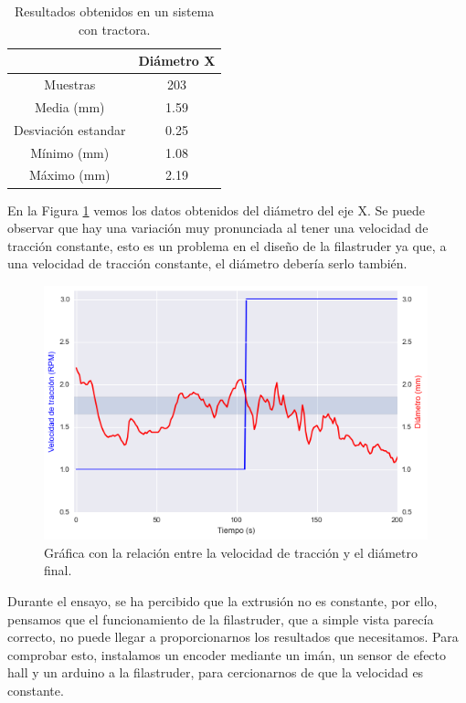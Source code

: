 \begin{table}[H]
    \centering
    \begin{tabular}{cc}
                   & Diámetro X \\ \hline
        Muestras    & 203        \\
        Media (mm) & 1.59       \\
        Desviación estandar & 0.25\\
        Mínimo (mm)   & 1.08       \\
        Máximo (mm)   & 2.19      
    \end{tabular}
    \caption{Resultados obtenidos en un sistema con tractora.}
    \label{tab:20007105-dat}
\end{table}

En la Figura \ref{fig:2007105-graf} vemos los datos obtenidos del diámetro del eje X. Se puede observar que hay una variación muy pronunciada al tener una velocidad de tracción constante, esto es un problema en el diseño de la filastruder ya que, a una velocidad de tracción constante, el diámetro debería serlo también.

\begin{figure}[H]
    \centering
    \includegraphics[width=0.99\textwidth]{images/producciones/20072015/output_8_0.png}
    \caption[Gráfica con la relación entre la velocidad de tracción y el diámetro final.]{Gráfica con la relación entre la velocidad de tracción y el diámetro final.}
    \label{fig:2007105-graf}
\end{figure}

 Durante el ensayo, se ha percibido que la extrusión no es constante, por ello, pensamos que el funcionamiento de la filastruder, que a simple vista parecía correcto, no puede llegar a proporcionarnos los resultados que necesitamos. Para comprobar esto, instalamos un encoder mediante un imán, un sensor de efecto hall y un arduino a la filastruder, para cercionarnos de que la velocidad es constante.

